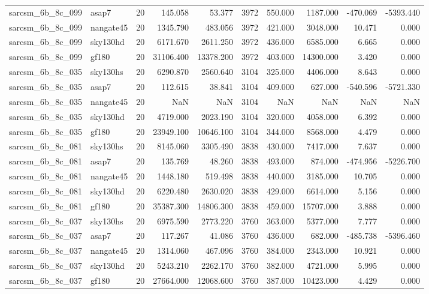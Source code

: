 \begin{tabular}{llrrrrrrrr}
sarcsm\_6b\_8c\_099 & asap7 & 20 & 145.058 & 53.377 & 3972 & 550.000 & 1187.000 & -470.069 & -5393.440 \\
sarcsm\_6b\_8c\_099 & nangate45 & 20 & 1345.790 & 483.056 & 3972 & 421.000 & 3048.000 & 10.471 & 0.000 \\
sarcsm\_6b\_8c\_099 & sky130hd & 20 & 6171.670 & 2611.250 & 3972 & 436.000 & 6585.000 & 6.665 & 0.000 \\
sarcsm\_6b\_8c\_099 & gf180 & 20 & 31106.400 & 13378.200 & 3972 & 403.000 & 14300.000 & 3.420 & 0.000 \\
sarcsm\_6b\_8c\_035 & sky130hs & 20 & 6290.870 & 2560.640 & 3104 & 325.000 & 4406.000 & 8.643 & 0.000 \\
sarcsm\_6b\_8c\_035 & asap7 & 20 & 112.615 & 38.841 & 3104 & 409.000 & 627.000 & -540.596 & -5721.330 \\
sarcsm\_6b\_8c\_035 & nangate45 & 20 & NaN & NaN & 3104 & NaN & NaN & NaN & NaN \\
sarcsm\_6b\_8c\_035 & sky130hd & 20 & 4719.000 & 2023.190 & 3104 & 320.000 & 4058.000 & 6.392 & 0.000 \\
sarcsm\_6b\_8c\_035 & gf180 & 20 & 23949.100 & 10646.100 & 3104 & 344.000 & 8568.000 & 4.479 & 0.000 \\
sarcsm\_6b\_8c\_081 & sky130hs & 20 & 8145.060 & 3305.490 & 3838 & 430.000 & 7417.000 & 7.637 & 0.000 \\
sarcsm\_6b\_8c\_081 & asap7 & 20 & 135.769 & 48.260 & 3838 & 493.000 & 874.000 & -474.956 & -5226.700 \\
sarcsm\_6b\_8c\_081 & nangate45 & 20 & 1448.180 & 519.498 & 3838 & 440.000 & 3185.000 & 10.705 & 0.000 \\
sarcsm\_6b\_8c\_081 & sky130hd & 20 & 6220.480 & 2630.020 & 3838 & 429.000 & 6614.000 & 5.156 & 0.000 \\
sarcsm\_6b\_8c\_081 & gf180 & 20 & 35387.300 & 14806.300 & 3838 & 459.000 & 15707.000 & 3.888 & 0.000 \\
sarcsm\_6b\_8c\_037 & sky130hs & 20 & 6975.590 & 2773.220 & 3760 & 363.000 & 5377.000 & 7.777 & 0.000 \\
sarcsm\_6b\_8c\_037 & asap7 & 20 & 117.267 & 41.086 & 3760 & 436.000 & 682.000 & -485.738 & -5396.460 \\
sarcsm\_6b\_8c\_037 & nangate45 & 20 & 1314.060 & 467.096 & 3760 & 384.000 & 2343.000 & 10.921 & 0.000 \\
sarcsm\_6b\_8c\_037 & sky130hd & 20 & 5243.210 & 2262.170 & 3760 & 382.000 & 4721.000 & 5.995 & 0.000 \\
sarcsm\_6b\_8c\_037 & gf180 & 20 & 27664.000 & 12068.600 & 3760 & 387.000 & 10423.000 & 4.429 & 0.000 \\

\end{tabular}
